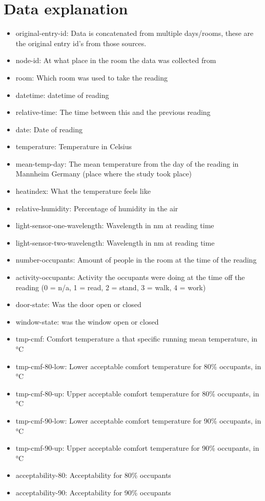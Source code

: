\documentclass[]{article}
\begin{document}
\section{Data explanation}
\begin{itemize}
\item  original-entry-id: Data is concatenated from multiple days/rooms, these are the original entry id's from those sources.
\item  node-id: At what place in the room the data was collected from
\item  room: Which room was used to take the reading 
\item  datetime: datetime of reading
\item  relative-time: The time between this and the previous reading
\item  date: Date of reading
\item  temperature: Temperature in Celsius
\item  mean-temp-day: The mean temperature from the day of the reading in Mannheim Germany (place where the study took place)
\item  heatindex: What the temperature feels like
\item  relative-humidity: Percentage of humidity in the air
\item  light-sensor-one-wavelength: Wavelength in nm at reading time
\item  light-sensor-two-wavelength: Wavelength in nm at reading time
\item  number-occupants: Amount of people in the room at the time of the reading
\item  activity-occupants: Activity the occupants were doing at the time off the reading  (0 = n/a, 1 = read, 2 = stand, 3 = walk, 4 = work)
\item  door-state: Was the door open or closed
\item  window-state: was the window open or closed
\item  tmp-cmf: Comfort temperature a that specific running mean temperature, in °C
\item  tmp-cmf-80-low: Lower acceptable comfort temperature for 80\% occupants, in °C
\item  tmp-cmf-80-up: Upper acceptable comfort temperature for 80\% occupants, in °C
\item  tmp-cmf-90-low: Lower acceptable comfort temperature for 90\% occupants, in °C
\item  tmp-cmf-90-up: Upper acceptable comfort temperature for 90\% occupants, in °C
\item  acceptability-80: Acceptability for 80\% occupants
\item  acceptability-90: Acceptability for 90\% occupants
\end{itemize}
\end{document}
